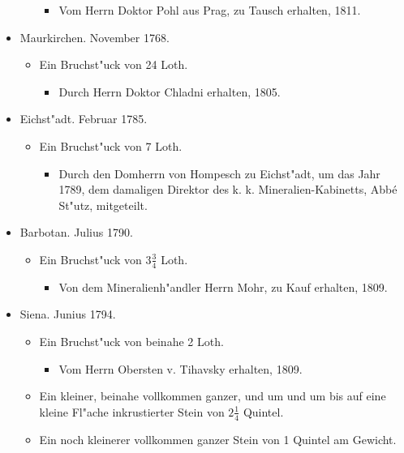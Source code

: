 \documentclass[a4paper, 11pt, oneside, polutonikogreek, german]{article}
\begin{document}
\begin{itemize}
\begin{itemize}
\begin{itemize}
            \item Vom Herrn Doktor Pohl aus Prag, zu Tausch erhalten, 1811.
        \end{itemize}
    \end{itemize}
    \item Maurkirchen. November 1768.
    \begin{itemize}
        \item Ein Bruchst"uck von 24 Loth.
        \begin{itemize}
            \item Durch Herrn Doktor Chladni erhalten, 1805.
        \end{itemize}
    \end{itemize}
    \item Eichst"adt. Februar 1785.
    \begin{itemize}
        \item Ein Bruchst"uck von 7 Loth.
        \begin{itemize}
            \item Durch den Domherrn von Hompesch zu Eichst"adt, um das Jahr 1789, dem damaligen Direktor des k. k. Mineralien-Kabinetts, Abbé St"utz, mitgeteilt.
        \end{itemize}
    \end{itemize}
    \item Barbotan. Julius 1790.
    \begin{itemize}
        \item Ein Bruchst"uck von $\mathfrak{3\frac{3}{4}}$ Loth.
        \begin{itemize}
            \item Von dem Mineralienh"andler Herrn Mohr, zu Kauf erhalten, 1809.
        \end{itemize}
    \end{itemize}
    \item Siena. Junius 1794.
    \begin{itemize}
        \item Ein Bruchst"uck von beinahe 2 Loth.
        \begin{itemize}
            \item Vom Herrn Obersten v. Tihavsky erhalten, 1809.
        \end{itemize}
        \item Ein kleiner, beinahe vollkommen ganzer, und um und um bis auf eine kleine Fl"ache inkrustierter Stein von $\mathfrak{2\frac{1}{4}}$ Quintel.
        \item Ein noch kleinerer vollkommen ganzer Stein von 1 Quintel am Gewicht.

\end{itemize}
\end{itemize}
\end{document}
